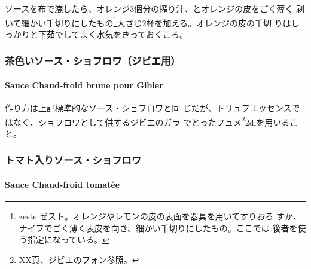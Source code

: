 ソースを布で漉したら、オレンジ3個分の搾り汁、とオレンジの皮をごく薄く
剥いて細かい千切りにしたもの\footnote{zeste
  ゼスト。オレンジやレモンの皮の表面を器具を用いてすりおろ
  すか、ナイフでごく薄く表皮を向き、細かい千切りにしたもの。ここでは
  後者を使う指定になっている。}大さじ2杯を加える。オレンジの皮の千切
りはしっかりと下茹でしてよく水気をきっておくころ。

\maeaki

\hypertarget{ux8336ux8272ux3044ux30bdux30fcux30b9ux30b7ux30e7ux30d5ux30edux30efux30b8ux30d3ux30a8ux7528}{%
\subsubsection{茶色いソース・ショフロワ（ジビエ用）}\label{ux8336ux8272ux3044ux30bdux30fcux30b9ux30b7ux30e7ux30d5ux30edux30efux30b8ux30d3ux30a8ux7528}}

\hypertarget{sauce-chaud-froid-brune-pour-gibier}{%
\paragraph{Sauce Chaud-froid brune pour
Gibier}\label{sauce-chaud-froid-brune-pour-gibier}}

  

作り方は上記\protect\hyperlink{sauce-chaud-froid-brune}{標準的なソース・ショフロワ}と同
じだが、トリュフエッセンスではなく、ショフロワとして供するジビエのガラ
でとったフュメ\footnote{XX頁、\protect\hyperlink{fonds-de-gibier}{ジビエのフォン}参照。}2dlを用いること。

\maeaki

\hypertarget{ux30c8ux30deux30c8ux5165ux308aux30bdux30fcux30b9ux30b7ux30e7ux30d5ux30edux30ef}{%
\subsubsection{トマト入りソース・ショフロワ}\label{ux30c8ux30deux30c8ux5165ux308aux30bdux30fcux30b9ux30b7ux30e7ux30d5ux30edux30ef}}

\hypertarget{sauce-chaud-froid-tomatee}{%
\paragraph{Sauce Chaud-froid tomatée}\label{sauce-chaud-froid-tomatee}}

